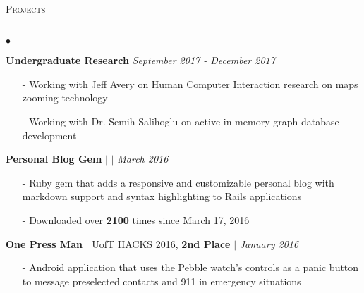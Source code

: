 \documentclass[11pt]{article}
\newcommand{\lineunder}{\vspace*{-8pt} \\ \hspace*{-18pt} \hrulefill \\}
\newcommand{\header}[1]{{\hspace*{-15pt}\vspace*{6pt} \textsc{#1}} \vspace*{-6pt} \lineunder }
\newenvironment{achievements}{\begin{list}{$\bullet$}{\topsep 0pt \itemsep -1.5pt \leftmargin 5pt}}{\vspace*{4pt}\end{list}}
\begin{document}
\header{\fontsize{12.2}{10}\selectfont Projects}
\begin{achievements}
\def\UrlFont{\em}

\item\textbf{Undergraduate Research} \hfill \textit{September 2017 - December 2017}
\vspace{2pt}
\begin{itemize}
    \item[-] Working with Jeff Avery on Human Computer Interaction research on maps zooming technology
    \vspace{2pt}
    \item[-] Working with Dr. Semih Salihoglu on active in-memory graph database development
\end{itemize}

\vspace{7pt}

\item \textbf{Personal Blog Gem}  $|$ 
\href{https://github.com/nakulpathak3/personal-blog-gem}{\faGithub}  $|$ \href{https://rubygems.org/gems/personal_blog}{\faExternalLink} \hfill \textit {March 2016}
\vspace{2pt}
\begin{itemize}
    \item[-]Ruby gem that adds a responsive and customizable personal blog with markdown support and syntax highlighting to Rails applications
    \vspace{2pt}
    \item[-]Downloaded over \textbf{2100} times since March 17, 2016
\end{itemize}

\vspace{7pt}

\item \textbf{One Press Man} {$|$ \scriptsize UofT HACKS 2016, \textbf{2nd Place}} $|$  \href{https://github.com/adrianmachado/Onepressman}{\faGithub} \hfill \textit {January 2016}
\vspace{2pt}
\begin{itemize}
    \item[-]Android application that uses the Pebble watch's controls as a panic button to message preselected contacts and 911 in emergency situations
\end{itemize}


\end{achievements}
\end{document}

